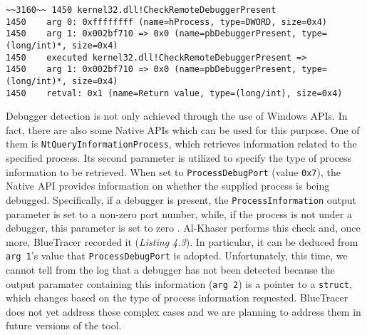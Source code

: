\vspace{0.5cm}
\begin{lstlisting}[caption={Log entry relative to \texttt{CheckRemoteDebuggerPresent}},captionpos=b]
~~3160~~ 1450 kernel32.dll!CheckRemoteDebuggerPresent
1450 	arg 0: 0xffffffff (name=hProcess, type=DWORD, size=0x4)
1450 	arg 1: 0x002bf710 => 0x0 (name=pbDebuggerPresent, type=(long/int)*, size=0x4)
1450    executed kernel32.dll!CheckRemoteDebuggerPresent =>
1450 	arg 1: 0x002bf710 => 0x0 (name=pbDebuggerPresent, type=(long/int)*, size=0x4)
1450 	retval: 0x1 (name=Return value, type=(long/int), size=0x4)
\end{lstlisting}

Debugger detection is not only achieved through the use of Windows APIs. In fact, there are also some Native APIs which can be used for this purpose. One of them is \texttt{NtQueryInformationProcess}, which retrieves information related to the specified process. Its second parameter is utilized to specify the type of process information to be retrieved. When set to \texttt{ProcessDebugPort} (value \texttt{0x7}), the Native API provides information on whether the supplied process is being debugged. Specifically, if a debugger is present, the \texttt{ProcessInformation} output parameter is set to a non-zero port number, while, if the process is not under a debugger, this parameter is set to zero \cite{Sikorski:2012:PMA:2181153}. Al-Khaser performs this check and, once more, BlueTracer recorded it (\textit{Listing 4.3}). In particular, it can be deduced from \texttt{arg 1}'s value that \texttt{ProcessDebugPort} is adopted. Unfortunately, this time, we cannot tell from the log that a debugger has not been detected because the output paramater containing this information (\texttt{arg 2}) is a pointer to a \texttt{struct}, which changes based on the type of process information requested. BlueTracer does not yet address these complex cases and we are planning to address them in future versions of the tool.  

